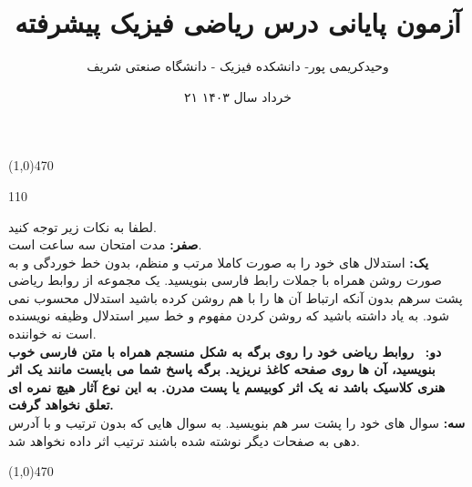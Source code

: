 \documentclass{article}
\title{  آزمون پایانی  درس ریاضی فیزیک پیشرفته  }
\author{وحیدکریمی پور- دانشکده فیزیک - دانشگاه صنعتی شریف
}
\date{۲۱ خرداد سال ۱۴۰۳}
\def\la{\langle}
\def\ra{\rangle}
\def\be{\begin{equation}}
\def\ee{\end{equation}}
\def\ba{\begin{eqnarray}}
\def\ea{\end{eqnarray}}
\def\lo{\longrightarrow}
\def\h{\hskip 1cm }
\def\hh{\hskip 2cm}
\def\la{\langle}
\def\ra{\rangle}
\def\a{\alpha}
\def\b{\beta}
\def\g{\gamma}
\def\d{\delta}
\def\e{\epsilon}
\def\l{\lambda}
\def\D{\Delta}
\def\G{\Gamma}
\def\L{\Lambda}
\def\m{\mu}
\def\n{\nu}
\def\bex{\begin{dinglist}{110}\dsquare}
\def\eee{\end{dinglist}}
\def\bet{\begin{dinglist}{110}\bsquare}
\newcommand{\bsquare}{\item[\color{myblue}\ding{110}]}
\newcommand{\dsquare}{\item[\color{mydark}\ding{110}]}
\newenvironment{parind}{%
	\par%
	\medskip
	\leftskip=10mm\rightskip=7mm
	\noindent\ignorespaces}{%
	\par\medskip}
\begin{document}
	\maketitle
	
	\def\be{\begin{equation}}
	\def\ee{\end{equation}}
	\def\ba{\begin{eqnarray}}
	\def\ea{\end{eqnarray}}
	\def\lo{\longrightarrow}
	\def\h{\hskip 1cm }
	\def\hh{\hskip 2cm}
	\def\la{\langle}
	\def\ra{\rangle}
	\def\a{\alpha}
	\def\b{\beta}
	\def\g{\gamma}
	\def\d{\delta}
	\def\e{\epsilon}
	\def\l{\lambda}
	\def\D{\Delta}
	\def\G{\Gamma}
	\def\L{\Lambda}
	\def\m{\mu}
	\def\n{\nu}
	\def\dbar{{\mathchar'26\mkern-12mu d}}
	\def\bex{\begin{dinglist}{110}\dsquare}
		\def\eee{\end{dinglist}}
	\def\bet{\begin{dinglist}{110}\bsquare}
		
		




  {\color{cyan}
\begin{center} \linethickness{1mm}\line(1,0){470} \end{center}
}
\vspace{-1.2em}
\bet{
\begin{parind}
لطفا به نکات زیر توجه کنید. \\
\textbf{صفر:} مدت امتحان سه ساعت است. \\
\textbf{یک: }استدلال های خود را به صورت کاملا مرتب و منظم، بدون خط خوردگی و به صورت روشن همراه با جملات رابط فارسی بنویسید. یک مجموعه از روابط ریاضی پشت سرهم بدون آنکه ارتباط آن ها را با هم  روشن کرده باشید استدلال محسوب نمی شود.  به یاد داشته باشید که روشن کردن مفهوم  و خط سیر استدلال وظیفه نویسنده است نه خواننده.\\
\textbf{دو:} 
{\bf {\ {روابط ریاضی خود را روی برگه  به شکل منسجم همراه با متن فارسی خوب بنویسید، آن ها روی صفحه کاغذ نریزید. برگه پاسخ  شما می بایست مانند یک اثر هنری کلاسیک باشد نه یک اثر کوبیسم یا پست مدرن. به این نوع آثار هیچ نمره ای تعلق نخواهد گرفت. }}}  \\
\textbf{سه:  } سوال های خود را پشت سر هم بنویسید. به سوال هایی که بدون ترتیب و با آدرس دهی  به صفحات دیگر نوشته شده باشند ترتیب اثر داده نخواهد شد. \\
\end{parind}
}\eee
\vspace{-4em
}
 {\color{cyan}
	\begin{center} \linethickness{1mm}\line(1,0){470} \end{center}
}
\newpage
\end{document}
